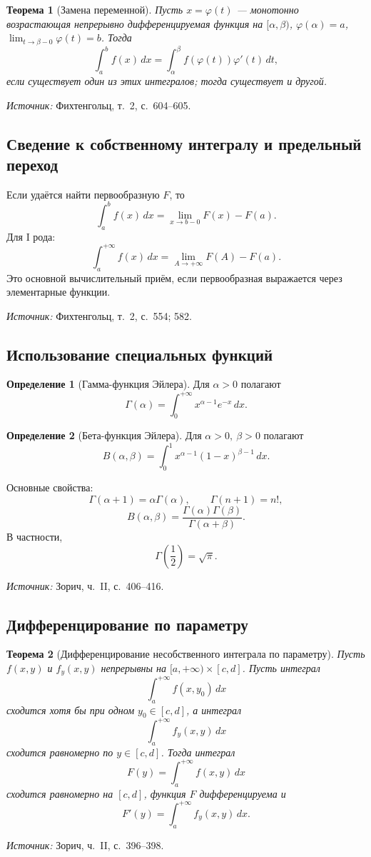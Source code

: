 \documentclass[12pt,a4paper]{article}
\newcommand{\source}[1]{\par\noindent\textit{Источник:} #1.}
\theoremstyle{definition}
\newtheorem{definition}{Определение}[section]
\theoremstyle{plain}
\newtheorem{theorem}{Теорема}[section]
\theoremstyle{remark}
\begin{document}
\begin{theorem}[Замена переменной]
Пусть \(x=\varphi(t)\) — монотонно возрастающая непрерывно дифференцируемая функция на \([\alpha,\beta)\), \(\varphi(\alpha)=a\), \(\lim_{t\to\beta-0}\varphi(t)=b\). Тогда
\[
\int_a^b f(x)\,dx=\int_\alpha^\beta f(\varphi(t))\varphi'(t)\,dt,
\]
если существует один из этих интегралов; тогда существует и другой.
\end{theorem}
\source{Фихтенгольц, т.~2, с.~604--605}

\subsection{Сведение к собственному интегралу и предельный переход}

Если удаётся найти первообразную \(F\), то
\[
\int_a^b f(x)\,dx=\lim_{x\to b-0}F(x)-F(a).
\]
Для I рода:
\[
\int_a^{+\infty}f(x)\,dx=\lim_{A\to+\infty}F(A)-F(a).
\]
Это основной вычислительный приём, если первообразная выражается через элементарные функции.
\source{Фихтенгольц, т.~2, с.~554; 582}

\subsection{Использование специальных функций}

\begin{definition}[Гамма-функция Эйлера]
Для \(\alpha>0\) полагают
\[
\Gamma(\alpha)=\int_0^{+\infty}x^{\alpha-1}e^{-x}\,dx.
\]
\end{definition}

\begin{definition}[Бета-функция Эйлера]
Для \(\alpha>0,\ \beta>0\) полагают
\[
B(\alpha,\beta)=\int_0^1 x^{\alpha-1}(1-x)^{\beta-1}\,dx.
\]
\end{definition}

Основные свойства:
\[
\Gamma(\alpha+1)=\alpha\Gamma(\alpha),\qquad \Gamma(n+1)=n!,
\]
\[
B(\alpha,\beta)=\frac{\Gamma(\alpha)\Gamma(\beta)}{\Gamma(\alpha+\beta)}.
\]
В частности,
\[
\Gamma\left(\frac12\right)=\sqrt{\pi}.
\]
\source{Зорич, ч.~II, с.~406--416}

\subsection{Дифференцирование по параметру}

\begin{theorem}[Дифференцирование несобственного интеграла по параметру]
Пусть \(f(x,y)\) и \(f_y(x,y)\) непрерывны на \([a,+\infty)\times[c,d]\). Пусть интеграл
\[
\int_a^{+\infty}f(x,y_0)\,dx
\]
сходится хотя бы при одном \(y_0\in[c,d]\), а интеграл
\[
\int_a^{+\infty}f_y(x,y)\,dx
\]
сходится равномерно по \(y\in[c,d]\). Тогда интеграл
\[
F(y)=\int_a^{+\infty}f(x,y)\,dx
\]
сходится равномерно на \([c,d]\), функция \(F\) дифференцируема и
\[
F'(y)=\int_a^{+\infty}f_y(x,y)\,dx.
\]
\end{theorem}
\source{Зорич, ч.~II, с.~396--398}
\end{document}
